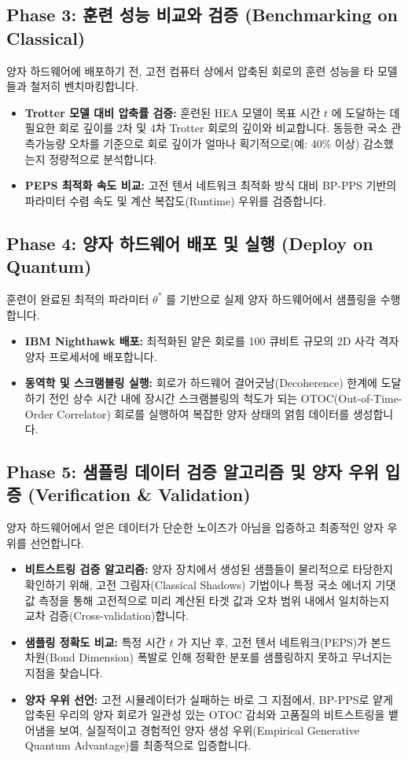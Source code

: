 \documentclass[11pt,a4paper]{article}
\begin{document}
\subsection*{Phase 3: 훈련 성능 비교와 검증 (Benchmarking on Classical)}
양자 하드웨어에 배포하기 전, 고전 컴퓨터 상에서 압축된 회로의 훈련 성능을 타 모델들과 철저히 벤치마킹합니다.

\begin{itemize}
    \item \textbf{Trotter 모델 대비 압축률 검증:} 훈련된 HEA 모델이 목표 시간 $t$ 에 도달하는 데 필요한 회로 깊이를 2차 및 4차 Trotter 회로의 깊이와 비교합니다. 동등한 국소 관측가능량 오차를 기준으로 회로 깊이가 얼마나 획기적으로(예: 40\% 이상) 감소했는지 정량적으로 분석합니다.
    \item \textbf{PEPS 최적화 속도 비교:} 고전 텐서 네트워크 최적화 방식 대비 BP-PPS 기반의 파라미터 수렴 속도 및 계산 복잡도(Runtime) 우위를 검증합니다.
\end{itemize}

\subsection*{Phase 4: 양자 하드웨어 배포 및 실행 (Deploy on Quantum)}
훈련이 완료된 최적의 파라미터 $\theta^*$ 를 기반으로 실제 양자 하드웨어에서 샘플링을 수행합니다.

\begin{itemize}
    \item \textbf{IBM Nighthawk 배포:} 최적화된 얕은 회로를 100 큐비트 규모의 2D 사각 격자 양자 프로세서에 배포합니다.
    \item \textbf{동역학 및 스크램블링 실행:} 회로가 하드웨어 결어긋남(Decoherence) 한계에 도달하기 전인 상수 시간 내에 장시간 스크램블링의 척도가 되는 OTOC(Out-of-Time-Order Correlator) 회로를 실행하여 복잡한 양자 상태의 얽힘 데이터를 생성합니다.
\end{itemize}

\subsection*{Phase 5: 샘플링 데이터 검증 알고리즘 및 양자 우위 입증 (Verification \& Validation)}
양자 하드웨어에서 얻은 데이터가 단순한 노이즈가 아님을 입증하고 최종적인 양자 우위를 선언합니다.

\begin{itemize}
    \item \textbf{비트스트링 검증 알고리즘:} 양자 장치에서 생성된 샘플들이 물리적으로 타당한지 확인하기 위해, 고전 그림자(Classical Shadows) 기법이나 특정 국소 에너지 기댓값 측정을 통해 고전적으로 미리 계산된 타겟 값과 오차 범위 내에서 일치하는지 교차 검증(Cross-validation)합니다.
    \item \textbf{샘플링 정확도 비교:} 특정 시간 $t$ 가 지난 후, 고전 텐서 네트워크(PEPS)가 본드 차원(Bond Dimension) 폭발로 인해 정확한 분포를 샘플링하지 못하고 무너지는 지점을 찾습니다.
    \item \textbf{양자 우위 선언:} 고전 시뮬레이터가 실패하는 바로 그 지점에서, BP-PPS로 얕게 압축된 우리의 양자 회로가 일관성 있는 OTOC 감쇠와 고품질의 비트스트링을 뱉어냄을 보여, 실질적이고 경험적인 양자 생성 우위(Empirical Generative Quantum Advantage)를 최종적으로 입증합니다.
\end{itemize}
\end{document}
